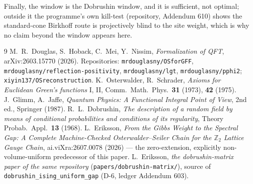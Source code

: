 \documentclass[11pt]{article}
\newcommand{\lean}[1]{\texttt{#1}}
\begin{document}
Finally, the window is the Dobrushin window, and it is sufficient, not
optimal; outside it the programme's own kill-test (repository,
Addendum 610) shows the standard-cone Birkhoff route is projectively
blind to the site weight, which is why no claim beyond the window
appears here.

\begin{thebibliography}{9}
 M.~R.~Douglas, S.~Hoback, C.~Mei, Y.~Nissim,
\emph{Formalization of QFT}, arXiv:2603.15770 (2026).  Repositories:
\lean{mrdouglasny/OSforGFF}, \lean{mrdouglasny/reflection-positivity},
\lean{mrdouglasny/lgt}, \lean{mrdouglasny/pphi2};
\lean{xiyin137/OSreconstruction}.
 K.~Osterwalder, R.~Schrader, \emph{Axioms for Euclidean
Green's functions} I, II, Comm.\ Math.\ Phys.\ \textbf{31} (1973),
\textbf{42} (1975).
 J.~Glimm, A.~Jaffe, \emph{Quantum Physics: A Functional
Integral Point of View}, 2nd ed., Springer (1987).
 R.~L.~Dobrushin, \emph{The description of a random field
by means of conditional probabilities and conditions of its
regularity}, Theory Probab.\ Appl.\ \textbf{13} (1968).
 L.~Eriksson, \emph{From the Gibbs Weight to the
Spectral Gap: A Complete Machine-Checked Osterwalder--Seiler Chain for
the $\mathbb{Z}_2$ Lattice Gauge Chain}, ai.viXra:2607.0078 (2026) ---
the zero-extension, explicitly non-volume-uniform predecessor of this
paper.
 L.~Eriksson, \emph{the dobrushin-matrix paper of the
same repository} (\lean{papers/dobrushin-matrix/}), source of
\lean{dobrushin\_ising\_uniform\_gap} (D-6, ledger Addendum 603).
\end{thebibliography}
\end{document}
